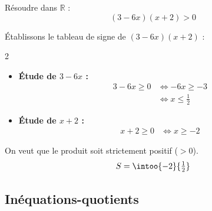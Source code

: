 \begin{methode}
	Résoudre dans $\mathbb{R}$ :
	\[
		(3 - 6x)(x + 2) > 0
	\]

	\begin{correction}
		Établissons le tableau de signe de $(3 - 6x)(x + 2)$ :

		\begin{multicols}{2}
			\begin{itemize}
				\item \textbf{Étude de $3 - 6x$ :}
				      \[
					      \begin{aligned}
						      3 - 6x \ge 0 & \iff -6x \ge -3         \\
						                   & \iff x \le \tfrac{1}{2}
					      \end{aligned}
				      \]

				\item \textbf{Étude de $x + 2$ :}
				      \[
					      \begin{aligned}
						      x + 2 \ge 0 & \iff x \ge -2
					      \end{aligned}
				      \]
			\end{itemize}
		\end{multicols}
		\begin{center}
		\end{center}

		On veut que le produit soit strictement positif ($> 0$).
		\[
			S = \intoo{-2}{\tfrac{1}{2}}
		\]
	\end{correction}
\end{methode}

\subsection{Inéquations-quotients}

